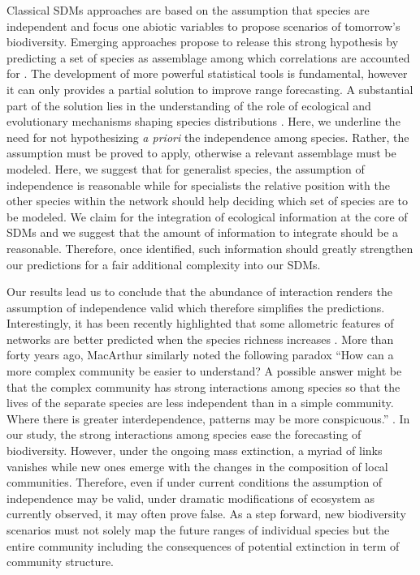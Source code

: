Classical SDMs approaches are based on the assumption that species are
independent and focus one abiotic variables \citep{Jeschke2008} to
propose scenarios of tomorrow's biodiversity. Emerging approaches
propose to release this strong hypothesis by predicting a set of species
as assemblage among which correlations are accounted for
\citep{Pollock2014, Warton2015b}. The development of more powerful
statistical tools is fundamental, however it can only provides a partial
solution to improve range forecasting. A substantial part of the
solution lies in the understanding of the role of ecological and
evolutionary mechanisms shaping species distributions
\citep{Thuiller2013}. Here, we underline the need for not hypothesizing
\emph{a priori} the independence among species. Rather, the assumption
must be proved to apply, otherwise a relevant assemblage must be
modeled. Here, we suggest that for generalist species, the assumption of
independence is reasonable while for specialists the relative position
with the other species within the network should help deciding which set
of species are to be modeled. We claim for the integration of ecological
information at the core of SDMs and we suggest that the amount of
information to integrate should be a reasonable. Therefore, once
identified, such information should greatly strengthen our predictions
for a fair additional complexity into our SDMs.

Our results lead us to conclude that the abundance of interaction
renders the assumption of independence valid which therefore simplifies
the predictions. Interestingly, it has been recently highlighted that
some allometric features of networks are better predicted when the
species richness increases \citep{Berlow2009}. More than forty years
ago, MacArthur similarly noted the following paradox ``How can a more
complex community be easier to understand? A possible answer might be
that the complex community has strong interactions among species so that
the lives of the separate species are less independent than in a simple
community. Where there is greater interdependence, patterns may be more
conspicuous.'' \citep[p.199]{macarthur1972geographical}. In our study,
the strong interactions among species ease the forecasting of
biodiversity. However, under the ongoing mass extinction, a myriad of
links vanishes while new ones emerge with the changes in the composition
of local communities. Therefore, even if under current conditions the
assumption of independence may be valid, under dramatic modifications of
ecosystem as currently observed, it may often prove false. As a step
forward, new biodiversity scenarios must not solely map the future
ranges of individual species but the entire community including the
consequences of potential extinction in term of community structure.

